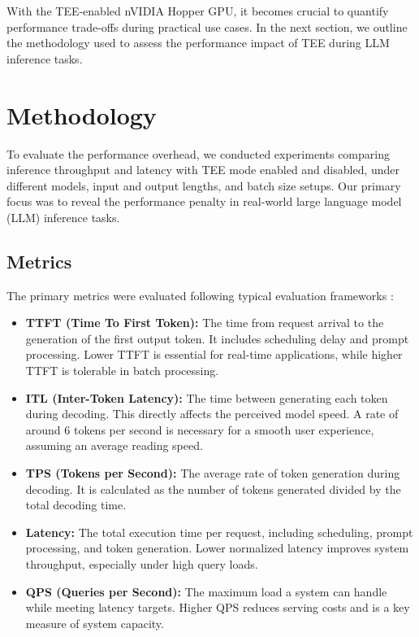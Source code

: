 \documentclass{article}
\begin{document}
With the TEE-enabled nVIDIA Hopper GPU, it becomes crucial to quantify performance trade-offs during practical use cases. In the next section, we outline the methodology used to assess the performance impact of TEE during LLM inference tasks.

\section{Methodology}

To evaluate the performance overhead, we conducted experiments comparing inference throughput and latency with TEE mode enabled and disabled, under different models, input and output lengths, and batch size setups. Our primary focus was to reveal the performance penalty in real-world large language model (LLM) inference tasks.

\subsection{Metrics}

The primary metrics were evaluated following typical evaluation frameworks \cite{agrawal2024metron}:

\begin{itemize}
    \item \textbf{TTFT (Time To First Token):} The time from request arrival to the generation of the first output token. It includes scheduling delay and prompt processing. Lower TTFT is essential for real-time applications, while higher TTFT is tolerable in batch processing.

    \item \textbf{ITL (Inter-Token Latency):} The time between generating each token during decoding. This directly affects the perceived model speed. A rate of around 6 tokens per second is necessary for a smooth user experience, assuming an average reading speed.

    \item \textbf{TPS (Tokens per Second):} The average rate of token generation during decoding. It is calculated as the number of tokens generated divided by the total decoding time.

    \item \textbf{Latency:} The total execution time per request, including scheduling, prompt processing, and token generation. Lower normalized latency improves system throughput, especially under high query loads.

    \item \textbf{QPS (Queries per Second):} The maximum load a system can handle while meeting latency targets. Higher QPS reduces serving costs and is a key measure of system capacity.
\end{itemize}
\end{document}
